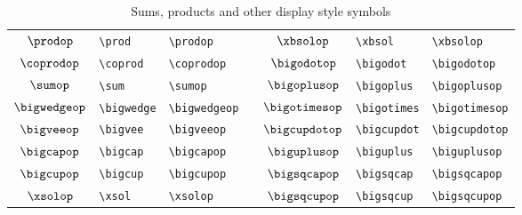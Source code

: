 \documentclass[captions=tableheading]{scrartcl}
\begin{document}
\begin{table}
  \caption{Sums, products and other display style symbols}
  \label{tab:small-integrals}
  \centering
  \begin{tabular}[c]{cllp{1pt}cll}
    \toprule
    $\prodop$ & \verb|\prod| & \verb|\prodop| & &
    $\xbsolop$ & \verb|\xbsol| & \verb|\xbsolop| \\
    $\coprodop$ & \verb|\coprod| & \verb|\coprodop| & &
    $\bigodotop$ & \verb|\bigodot| & \verb|\bigodotop| \\
    $\sumop$ & \verb|\sum| & \verb|\sumop| & &
    $\bigoplusop$ & \verb|\bigoplus| & \verb|\bigoplusop| \\
    $\bigwedgeop$ & \verb|\bigwedge| & \verb|\bigwedgeop| & &
    $\bigotimesop$ & \verb|\bigotimes| & \verb|\bigotimesop| \\
    \addlinespace
    $\bigveeop$ & \verb|\bigvee| & \verb|\bigveeop| & &
    $\bigcupdotop$ & \verb|\bigcupdot| & \verb|\bigcupdotop| \\
    $\bigcapop$ & \verb|\bigcap| & \verb|\bigcapop| & &
    $\biguplusop$ & \verb|\biguplus| & \verb|\biguplusop| \\
    $\bigcupop$ & \verb|\bigcup| & \verb|\bigcupop| & &
    $\bigsqcapop$ & \verb|\bigsqcap| & \verb|\bigsqcapop| \\
    $\xsolop$ & \verb|\xsol| & \verb|\xsolop| & &
    $\bigsqcupop$ & \verb|\bigsqcup| & \verb|\bigsqcupop| \\
    \bottomrule
  \end{tabular}
\end{table}
\end{document}
